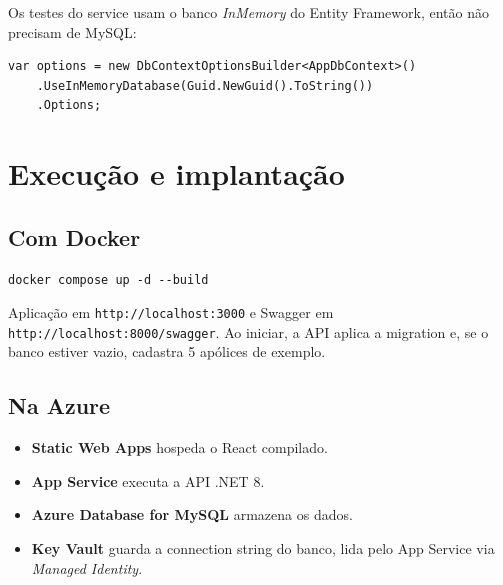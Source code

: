 \documentclass[11pt,a4paper]{article}
\begin{document}
Os testes do service usam o banco \emph{InMemory} do Entity Framework, então não precisam de MySQL:

\begin{lstlisting}[style=cs,numbers=none]
var options = new DbContextOptionsBuilder<AppDbContext>()
    .UseInMemoryDatabase(Guid.NewGuid().ToString())
    .Options;
\end{lstlisting}

\section{Execução e implantação}

\subsection{Com Docker}

\begin{lstlisting}[style=txt]
docker compose up -d --build
\end{lstlisting}

Aplicação em \texttt{http://localhost:3000} e Swagger em \texttt{http://localhost:8000/swagger}.
Ao iniciar, a API aplica a migration e, se o banco estiver vazio, cadastra 5 apólices de exemplo.

\subsection{Na Azure}

\begin{center}
\end{center}

\begin{itemize}
  \item \textbf{Static Web Apps} hospeda o React compilado.
  \item \textbf{App Service} executa a API .NET 8.
  \item \textbf{Azure Database for MySQL} armazena os dados.
  \item \textbf{Key Vault} guarda a connection string do banco, lida pelo App Service via
        \emph{Managed Identity}.
\end{itemize}
\end{document}
